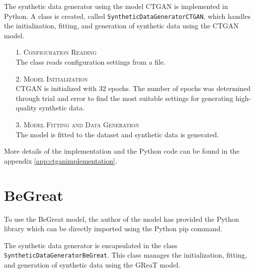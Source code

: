 The synthetic data generator using the model CTGAN is implemented in Python. A class is created, called \texttt{SyntheticDataGeneratorCTGAN}, which handles the initialization, fitting, and generation of synthetic data using the CTGAN model.

\begin{enumerate}
    \item[1.] \textsc{Configuration Reading}\\ 
    The class reads configuration settings from a file.
    
    \item[2.] \textsc{Model Initialization}\\
    CTGAN is initialized with 32 epochs. The number of epochs was determined through trial and error to find the most suitable settings for generating high-quality synthetic data.
    
    \item[3.] \textsc{Model Fitting and Data Generation}\\ 
    The model is fitted to the dataset and synthetic data is generated.

\end{enumerate}


\noindent More details of the implementation and the Python code can be found in the appendix \ref{app:ctganimplementation}.



\vspace{0.5cm}
\section{BeGreat}

To use the BeGreat model, the author of the model has provided the Python library which can be directly imported using the Python pip command.

The synthetic data generator is encapsulated in the class \texttt{SyntheticDataGeneratorBeGreat}. This class manages the initialization, fitting, and generation of synthetic data using the GReaT model.

